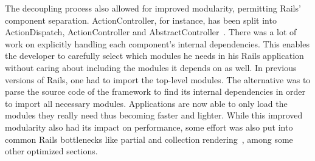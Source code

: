 The decoupling process also allowed for improved modularity, permitting Rails' component separation. ActionController, for instance, has been split into ActionDispatch, ActionController and AbstractController~\cite{vaporware_to_awesome}. There was a lot of work on explicitly handling each component's internal dependencies. This enables the developer to carefully select which modules he needs in his Rails application without caring about including the modules it depends on as well. In previous versions of Rails, one had to import the top-level modules. The alternative was to parse the source code of the framework to find its internal dependencies in order to import all necessary modules. Applications are now able to only load the modules they really need thus becoming faster and lighter.
While this improved modularity also had its impact on performance, some effort was also put into common Rails bottlenecks like partial and collection rendering~\cite{vaporware_to_awesome}, among some other optimized sections.

